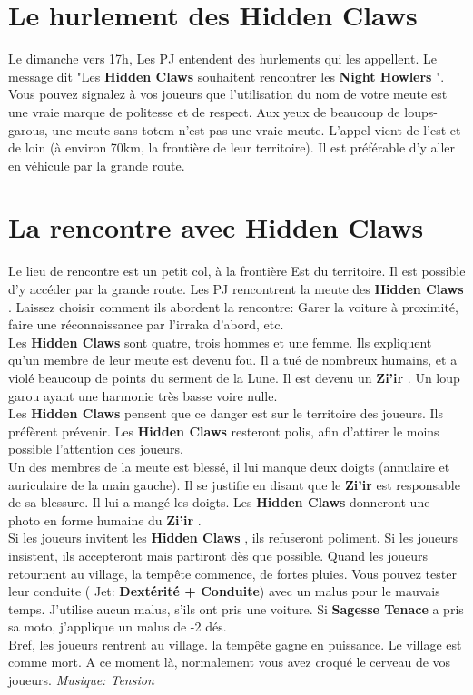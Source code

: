 \documentclass[oneside,12pt]{book}
\newcommand\roll[1]{
( Jet: \textbf{#1})
}
\newcommand{\Jessica}{\textbf{Sagesse Tenace} }
\newcommand{\Thomas}{\textbf{Zi'ir} }
\newcommand{\Night}{\textbf{Night Howlers} }
\newcommand{\Hidden}{\textbf{Hidden Claws} }
\begin{document}
\begin{flushleft}
\section{Le hurlement des \Hidden}
Le dimanche vers 17h, Les PJ entendent des hurlements qui les appellent.  
Le message dit "Les \Hidden souhaitent rencontrer les \Night ". 
Vous pouvez signalez à vos joueurs que l'utilisation du nom de votre meute est une vraie marque de politesse et de respect. 
Aux yeux de beaucoup de loups-garous, une meute sans totem n'est pas une vraie meute. 
L'appel vient de l'est et de loin (à environ 70km, la frontière de leur territoire). 
Il est préférable d'y aller en véhicule par la grande route.

\section{La rencontre avec \Hidden}
Le lieu de rencontre est un petit col, à la frontière Est du territoire. 
Il est possible d'y accéder par la grande route.
Les PJ rencontrent la meute des \Hidden. Laissez choisir comment ils abordent la rencontre: 
Garer la voiture à proximité, faire une réconnaissance par l'irraka d'abord, etc.\\ 
Les \Hidden sont quatre, trois hommes et une femme.
Ils expliquent qu'un membre de leur meute est devenu fou. 
Il a tué de nombreux humains, et a violé beaucoup de points du serment de la Lune. 
Il est devenu un \Thomas. Un loup garou ayant une harmonie très basse voire nulle. \\
Les \Hidden pensent que ce danger est sur le territoire des joueurs. Ils préfèrent prévenir. 
Les \Hidden resteront polis, afin d'attirer le moins possible l'attention des joueurs. \\
Un des membres de la meute est blessé, il lui manque deux doigts (annulaire et auriculaire de la main gauche). 
Il se justifie en disant que le \Thomas est responsable de sa blessure. Il lui a mangé les doigts. 
Les \Hidden donneront une photo en forme humaine du \Thomas.\\
Si les joueurs invitent les \Hidden, ils refuseront poliment. 
Si les joueurs insistent, ils accepteront mais partiront dès que possible.
Quand les joueurs retournent au village, la tempête commence, de fortes pluies. 
Vous pouvez tester leur conduite \roll{Dextérité + Conduite} avec un malus pour le mauvais temps. 
J'utilise aucun malus, s'ils ont pris une voiture. Si \Jessica a pris sa moto, j'applique un malus de -2 dés.\\
Bref, les joueurs rentrent au village. la tempête gagne en puissance. 
Le village est comme mort. A ce moment là, normalement vous avez croqué le cerveau de vos joueurs.  
\textit{Musique: Tension}



\end{flushleft}
\end{document}
